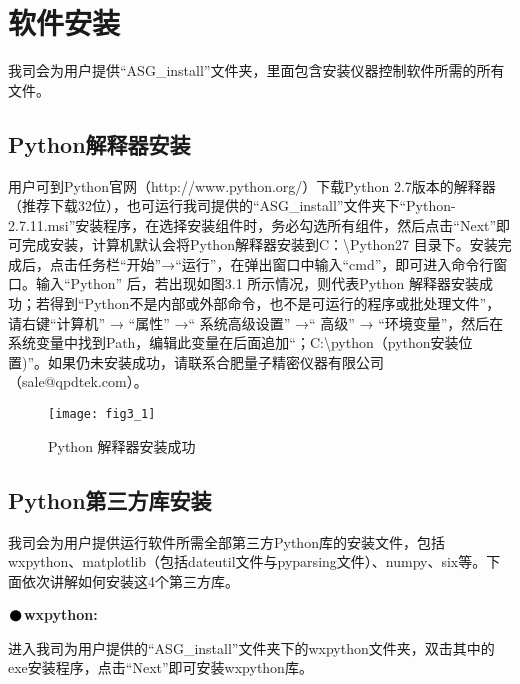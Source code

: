 \pagestyle{fancy}
\chapter{\heiti 软件安装}
\setmainfont{Times New Roman}

我司会为用户提供“ASG\_install”文件夹，里面包含安装仪器控制软件所需的所有文件。

\section{Python\heiti 解释器安装}
用户可到Python官网（http://www.python.org/）下载Python 2.7版本的解释器（推荐下载32位），也可运行我司提供的“ASG\_install”文件夹下“Python-2.7.11.msi”安装程序，在选择安装组件时，务必勾选所有组件，然后点击“Next”即可完成安装，计算机默认会将Python解释器安装到C：\textbackslash Python27 目录下。安装完成后，点击任务栏“开始”→“运行”，在弹出窗口中输入“cmd”，即可进入命令行窗口。输入“Python” 后，若出现如图3.1 所示情况，则代表Python 解释器安装成功；若得到“Python不是内部或外部命令，也不是可运行的程序或批处理文件”，请右键“计算机” → “属性” →“ 系统高级设置” →“ 高级” → “环境变量”，然后在系统变量中找到Path，编辑此变量在后面追加“；C:\textbackslash python（python安装位置)”。如果仍未安装成功，请联系合肥量子精密仪器有限公司（sale@qpdtek.com）。
\begin{figure}[ht]
\centering
\texttt{[image: fig3\_1]}
\caption{Python 解释器安装成功}
\end{figure}

\newpage
\section{Python\heiti 第三方库安装}
我司会为用户提供运行软件所需全部第三方Python库的安装文件，包括wxpython、matplotlib（包括dateutil文件与pyparsing文件）、numpy、six等。下面依次讲解如何安装这4个第三方库。
\vspace{0.3cm}

\noindent$\vcenter{\hbox{\huge$\bullet$}}$\quad\fontsize{12pt}{\baselineskip}\textbf{wxpython:}

进入我司为用户提供的“ASG\_install”文件夹下的wxpython文件夹，双击其中的exe安装程序，点击“Next”即可安装wxpython库。
\vspace{0.3cm}

